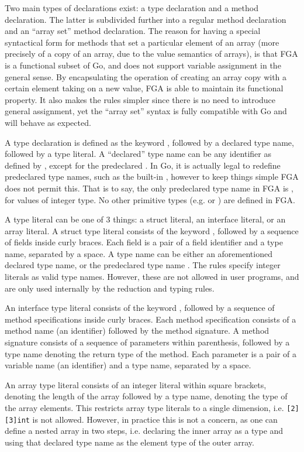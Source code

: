 Two main types of declarations exist: a type declaration and a method
declaration. The latter is subdivided further into a regular method declaration
and an ``array set'' method declaration. The reason for having a special
syntactical form for methods that set a particular element of an array (more
precisely of a copy of an array, due to the value semantics of arrays), is that
FGA is a functional subset of Go, and does not support variable assignment in
the general sense. By encapsulating the operation of creating an array copy with
a certain element taking on a new value, FGA is able to maintain its functional
property. It also makes the rules simpler since there is no need to introduce
general assignment, yet the ``array set'' syntax is fully compatible with Go and
will behave as expected.

A type declaration is defined as the keyword \type, followed by a declared type
name, followed by a type literal. A ``declared'' type name can be any identifier
as defined by \autocite{spec}, except for the predeclared . In Go, it is
actually legal to redefine predeclared type names, such as the built-in
, however to keep things simple FGA does not permit this. That is to say,
the only predeclared type name in FGA is , for values of integer type.
No other primitive types (e.g.  or ) are defined in FGA.

A type literal can be one of 3 things: a struct literal, an interface literal,
or an array literal. A struct type literal consists of the keyword \struct,
followed by a sequence of fields inside curly braces. Each field is a pair of a
field identifier and a type name, separated by a space. A type name can be
either an aforementioned declared type name, or the predeclared type name
. The rules specify integer literals as valid type names. However, these
are not allowed in user programs, and are only used internally by the reduction
and typing rules.

An interface type literal consists of the keyword \interface, followed by a
sequence of method specifications inside curly braces. Each method specification
consists of a method name (an identifier) followed by the method signature. A
method signature consists of a sequence of parameters within parenthesis,
followed by a type name denoting the return type of the method. Each parameter
is a pair of a variable name (an identifier) and a type name, separated by a
space.

An array type literal consists of an integer literal within square brackets,
denoting the length of the array followed by a type name, denoting the type of
the array elements. This restricts array type literals to a single dimension,
i.e. \texttt{[2][3]int} is not allowed. However, in practice this is not a
concern, as one can define a nested array in two steps, i.e. declaring the inner
array as a type and using that declared type name as the element type of the
outer array.

